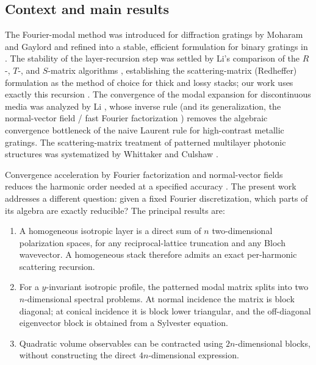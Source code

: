 \documentclass[11pt]{article}
\theoremstyle{remark}
\begin{document}
\subsection{Context and main results}

The Fourier-modal method was introduced for diffraction gratings by Moharam and
Gaylord \cite{moharam1981rcwa} and refined into a stable, efficient formulation
for binary gratings in \cite{moharam1995formulation}. The stability of the
layer-recursion step was settled by Li's comparison of the $R$-, $T$-, and
$S$-matrix algorithms \cite{li1996recursive}, establishing the scattering-matrix
(Redheffer) formulation as the method of choice for thick and lossy stacks; our
work uses exactly this recursion \cite{redheffer1962transmission}. The
convergence of the modal expansion for discontinuous media was analyzed by Li
\cite{li1996fourier}, whose inverse rule (and its generalization, the
normal-vector field / fast Fourier factorization \cite{li1997formulation})
removes the algebraic convergence bottleneck of the naive Laurent rule for
high-contrast metallic gratings. The scattering-matrix treatment of patterned
multilayer photonic structures was systematized by Whittaker and Culshaw
\cite{whittaker1999scattering}.

Convergence acceleration by Fourier factorization and normal-vector fields
reduces the harmonic order needed at a specified accuracy
\cite{li1996fourier,li1997formulation}.  The present work addresses a different
question: given a fixed Fourier discretization, which parts of its algebra are
exactly reducible?  The principal results are:

\begin{enumerate}
\item A homogeneous isotropic layer is a direct sum of $n$ two-dimensional
  polarization spaces, for any reciprocal-lattice truncation and any Bloch
  wavevector.  A homogeneous stack therefore admits an exact per-harmonic
  scattering recursion.
\item For a $y$-invariant isotropic profile, the patterned modal matrix splits
  into two $n$-dimensional spectral problems.  At normal incidence the matrix
  is block diagonal; at conical incidence it is block lower triangular, and
  the off-diagonal eigenvector block is obtained from a Sylvester equation.
\item Quadratic volume observables can be contracted using $2n$-dimensional
  blocks, without constructing the direct $4n$-dimensional expression.
\end{enumerate}
\end{document}
